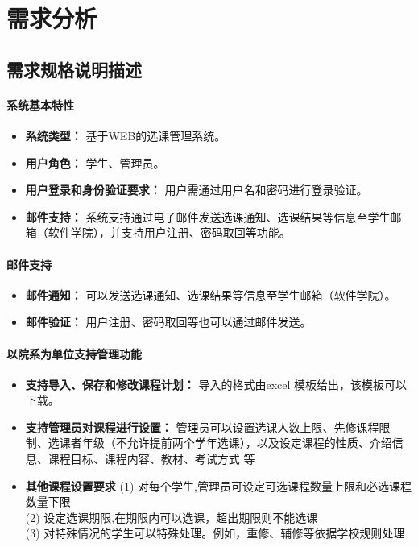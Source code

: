 \documentclass{article}
\begin{document}
\section{需求分析}
\subsection{需求规格说明描述}
\paragraph{系统基本特性}
\begin{itemize}
	\item \textbf{系统类型：} 基于WEB的选课管理系统。
	\item \textbf{用户角色：} 学生、管理员。
	\item \textbf{用户登录和身份验证要求：} 用户需通过用户名和密码进行登录验证。
	\item \textbf{邮件支持：} 系统支持通过电子邮件发送选课通知、选课结果等信息至学生邮箱（软件学院），并支持用户注册、密码取回等功能。
\end{itemize}

\paragraph{邮件支持}
\begin{itemize}
	\item \textbf{邮件通知：} 可以发送选课通知、选课结果等信息至学生邮箱（软件学院）。
	\item \textbf{邮件验证：} 用户注册、密码取回等也可以通过邮件发送。
\end{itemize}

\paragraph{以院系为单位支持管理功能}
\begin{itemize}
	\item \textbf{支持导入、保存和修改课程计划：} 导入的格式由excel 模板给出，该模板可以下载。
	\item \textbf{支持管理员对课程进行设置：} 管理员可以设置选课人数上限、先修课程限制、选课者年级（不允许提前两个学年选课），以及设定课程的性质、介绍信息、课程目标、课程内容、教材、考试方式 等
	\item \textbf{其他课程设置要求}
	(1) 对每个学生,管理员可设定可选课程数量上限和必选课程数量下限\\
	(2) 设定选课期限,在期限内可以选课，超出期限则不能选课\\
	(3) 对特殊情况的学生可以特殊处理。例如，重修、辅修等依据学校规则处理\\
\end{itemize}
\end{document}
